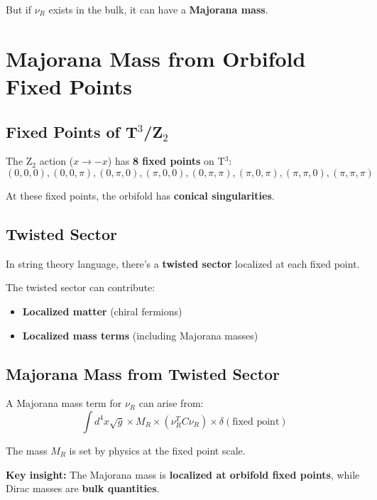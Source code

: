 \documentclass[12pt,a4paper]{article}
\begin{document}
But if $\nu_R$ exists in the bulk, it can have a \textbf{Majorana mass}.

\section{Majorana Mass from Orbifold Fixed Points}

\subsection{Fixed Points of T$^3$/Z$_2$}

The Z$_2$ action ($x \rightarrow -x$) has \textbf{8 fixed points} on T$^3$:
\begin{equation}
(0,0,0), (0,0,\pi), (0,\pi,0), (\pi,0,0), (0,\pi,\pi), (\pi,0,\pi), (\pi,\pi,0), (\pi,\pi,\pi)
\end{equation}

At these fixed points, the orbifold has \textbf{conical singularities}.

\subsection{Twisted Sector}

In string theory language, there's a \textbf{twisted sector} localized at each fixed point.

The twisted sector can contribute:
\begin{itemize}
\item \textbf{Localized matter} (chiral fermions)
\item \textbf{Localized mass terms} (including Majorana masses)
\end{itemize}

\subsection{Majorana Mass from Twisted Sector}

A Majorana mass term for $\nu_R$ can arise from:
\begin{equation}
\int d^4x \sqrt{g} \times M_R \times (\nu_R^T C \nu_R) \times \delta(\text{fixed point})
\end{equation}

The mass $M_R$ is set by physics at the fixed point scale.

\textbf{Key insight:} The Majorana mass is \textbf{localized at orbifold fixed points}, while Dirac masses are \textbf{bulk quantities}.
\end{document}
